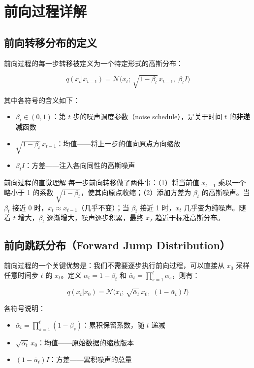 \section{前向过程详解}

\subsection{前向转移分布的定义}

前向过程的每一步转移被定义为一个特定形式的高斯分布：

$$q(x_t | x_{t-1}) = \mathcal{N}\big(x_t;\, \sqrt{1 - \beta_t}\, x_{t-1},\; \beta_t I\big)$$

其中各符号的含义如下：
\begin{itemize}
    \item $\beta_t \in (0, 1)$：第 $t$ 步的噪声调度参数（noise schedule），是关于时间 $t$ 的\textbf{非递减}函数
    \item $\sqrt{1 - \beta_t}\, x_{t-1}$：均值——将上一步的值向原点方向缩放
    \item $\beta_t I$：方差——注入各向同性的高斯噪声
\end{itemize}

\begin{importantbox}{前向过程的直觉理解}
每一步前向转移做了两件事：（1）将当前值 $x_{t-1}$ 乘以一个略小于 1 的系数 $\sqrt{1-\beta_t}$，使其向原点收缩；（2）添加方差为 $\beta_t$ 的高斯噪声。当 $\beta_t$ 接近 0 时，$x_t \approx x_{t-1}$（几乎不变）；当 $\beta_t$ 接近 1 时，$x_t$ 几乎变为纯噪声。随着 $t$ 增大，$\beta_t$ 逐渐增大，噪声逐步积累，最终 $x_T$ 趋近于标准高斯分布。
\end{importantbox}

\subsection{前向跳跃分布（Forward Jump Distribution）}

前向过程的一个关键优势是：我们不需要逐步执行前向过程，可以直接从 $x_0$ 采样任意时间步 $t$ 的 $x_t$。定义 $\alpha_t = 1 - \beta_t$ 和 $\bar{\alpha}_t = \prod_{s=1}^{t} \alpha_s$，则有：

$$q(x_t | x_0) = \mathcal{N}\big(x_t;\, \sqrt{\bar{\alpha}_t}\, x_0,\; (1 - \bar{\alpha}_t) I\big)$$

各符号说明：
\begin{itemize}
    \item $\bar{\alpha}_t = \prod_{s=1}^{t}(1-\beta_s)$：累积保留系数，随 $t$ 递减
    \item $\sqrt{\bar{\alpha}_t}\, x_0$：均值——原始数据的缩放版本
    \item $(1 - \bar{\alpha}_t) I$：方差——累积噪声的总量
\end{itemize}


